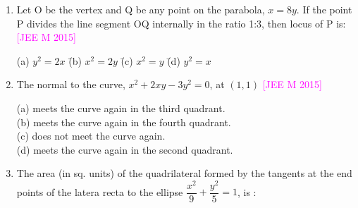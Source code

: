 \documentclass[journal,12pt,twocolumn]{IEEEtran}
\theoremstyle{remark}
\begin{document}
\begin{enumerate}[label=\textcolor{magenta}{\arabic*.}]
    \hfill{\textcolor{magenta}{[JEE M 2014]}}
    \begin{tabbing}
        (a) $\dfrac{1}{8}$ \hspace{2em} \= (b) $\dfrac{2}{3}$ \hspace{2em} \= (c) $\dfrac{1}{2}$ \hspace{2em} \= (d) $\dfrac{3}{2}$ \\
    \end{tabbing}
    \item Let O be the vertex and Q be any point on the parabola, $x=8y$. If the point P divides the line segment OQ internally in the ratio 1:3, then locus of P is:
    \hfill{\textcolor{magenta}{[JEE M 2015]}}
    \begin{tabbing}
        (a) $y^2=2x$ \hspace{0em} \= (b) $x^2=2y$ \hspace{0em} \= (c) $x^2=y$ \hspace{0em} \= (d) $y^2=x$ \\
    \end{tabbing}
    \item The normal to the curve, $x^2+2xy-3y^2=0$, at $(1,1)$
    \hfill{\textcolor{magenta}{[JEE M 2015]}}

    (a) meets the curve again in the third quadrant.\\
    (b) meets the curve again in the fourth quadrant.\\
    (c) does not meet the curve again.\\
    (d) meets the curve again in the second quadrant.\\
    \item The area (in sq. units) of the quadrilateral formed by the tangents at the end points of the latera recta to the ellipse $\dfrac{x^2}{9}+\dfrac{y^2}{5}=1$, is :
    

\end{enumerate}
\end{document}
